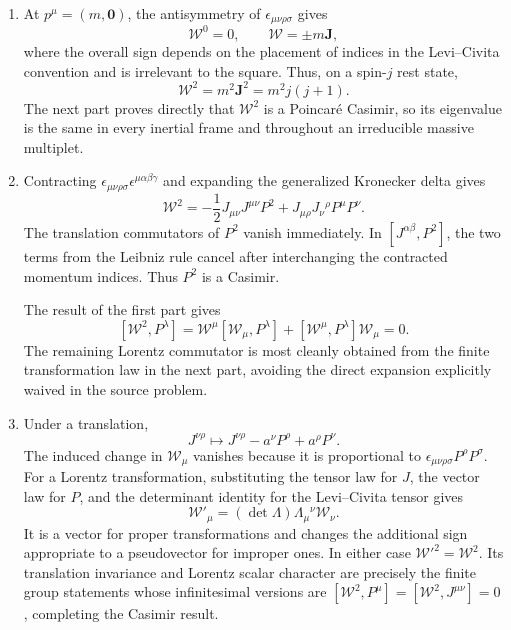 \begin{enumerate}
\begin{enumerate}
For the remaining commutator, expand both Pauli--Lubanski operators, move
momenta through one another, and use \([J,J]\) plus the result just proved.
Terms with two momenta cancel in antisymmetric pairs, leaving
\[
 [\mathcal W_\mu,\mathcal W_\nu]
 =-\ii\epsilon_{\mu\nu\rho\sigma}\mathcal W^\rho P^\sigma .
\]
\item
At \(p^\mu=(m,\mathbf0)\), the antisymmetry of
\(\epsilon_{\mu\nu\rho\sigma}\) gives
\[
 \mathcal W^0=0,\qquad
 \boldsymbol{\mathcal W}=\pm m\mathbf J,
\]
where the overall sign depends on the placement of indices in the
Levi--Civita convention and is irrelevant to the square.  Thus, on a
spin-\(j\) rest state,
\[
 \mathcal W^2=m^2\mathbf J^2=m^2j(j+1).
\]
The next part proves directly that \(\mathcal W^2\) is a Poincar\'e
Casimir, so its eigenvalue is the same in every inertial frame and
throughout an irreducible massive multiplet.
\item
Contracting
\(\epsilon_{\mu\nu\rho\sigma}\epsilon^{\mu\alpha\beta\gamma}\)
and expanding the generalized Kronecker delta gives
\[
 \mathcal W^2
 =-\frac12J_{\mu\nu}J^{\mu\nu}P^2
  +J_{\mu\rho}J_\nu{}^\rho P^\mu P^\nu .
\]
The translation commutators of \(P^2\) vanish immediately.  In
\([J^{\alpha\beta},P^2]\), the two terms from the Leibniz rule cancel after
interchanging the contracted momentum indices.  Thus \(P^2\) is a
Casimir.

The result of the first part gives
\[
 [\mathcal W^2,P^\lambda]
 =\mathcal W^\mu[\mathcal W_\mu,P^\lambda]
  +[\mathcal W^\mu,P^\lambda]\mathcal W_\mu=0.
\]
The remaining Lorentz commutator is most cleanly obtained from the finite
transformation law in the next part, avoiding the direct expansion
explicitly waived in the source problem.
\item
Under a translation,
\[
 J^{\nu\rho}\mapsto J^{\nu\rho}-a^\nu P^\rho+a^\rho P^\nu.
\]
The induced change in \(\mathcal W_\mu\) vanishes because it is
proportional to \(\epsilon_{\mu\nu\rho\sigma}P^\rho P^\sigma\).
For a Lorentz transformation, substituting the tensor law for \(J\), the
vector law for \(P\), and the determinant identity for the Levi--Civita
tensor gives
\[
 \mathcal W'_\mu=(\det\Lambda)\Lambda_\mu{}^\nu\mathcal W_\nu.
\]
It is a vector for proper transformations and changes the additional sign
appropriate to a pseudovector for improper ones.  In either case
\(\mathcal W'^2=\mathcal W^2\).  Its translation invariance and Lorentz
scalar character are precisely the finite group statements whose
infinitesimal versions are
\([\mathcal W^2,P^\mu]=[\mathcal W^2,J^{\mu\nu}]=0\), completing the
Casimir result.
\end{enumerate}


\end{enumerate}
